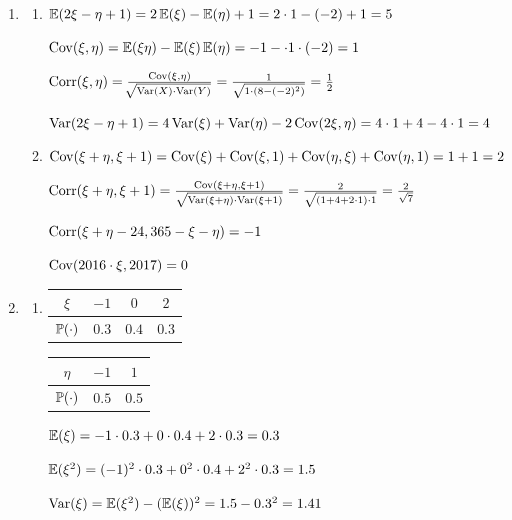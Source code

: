 \begin{enumerate}
\item \begin{enumerate}
\item $\E (2\xi - \eta +1) = 2 \E (\xi) - \E (\eta) + 1 = 2\cdot 1 - (-2) + 1 = 5 $

$\Cov (\xi, \eta) = \E (\xi \eta) - \E(\xi) \E(\eta) = -1 - \cdot 1 \cdot (-2) = 1$

$\Corr (\xi, \eta) = \frac{\Cov(\xi, \eta)}{\sqrt[]{\Var(X) \cdot \Var(Y)}} = \frac{1}{\sqrt{1 \cdot (8-(-2)^2)}} = \frac{1}{2}$

$\Var (2\xi - \eta + 1) = 4\Var(\xi) + \Var(\eta) - 2 \Cov (2\xi, \eta) = 4 \cdot 1 + 4 - 4 \cdot 1 = 4$

\item $\Cov(\xi + \eta, \xi + 1) = \Cov(\xi) + \Cov(\xi, 1) + \Cov(\eta, \xi) + \Cov(\eta, 1) = 1 +1 = 2$

$\Corr(\xi + \eta , \xi + 1) = \frac{\Cov(\xi + \eta , \xi + 1)}{\sqrt{\Var(\xi + \eta)\cdot \Var (\xi + 1)}} = \frac{2}{\sqrt{(1+4+2\cdot 1) \cdot 1}} = \frac{2}{\sqrt{7}}$

$\Corr(\xi + \eta - 24, 365 - \xi - \eta) = -1$

$\Cov(2016\cdot \xi, 2017) = 0$

\end{enumerate}
\item \begin{enumerate}
\item

\begin{center}
\begin{tabular}{cccc}
\toprule
$\xi$ & $-1$ & $0$ & $2$ \\ \midrule
$\P(\cdot)$ & $0.3$ & $0.4$ & $0.3$ \\ \bottomrule
\end{tabular}
\hspace{1cm}
\begin{tabular}{ccc}
\toprule
$\eta$ & $-1$ & $1$ \\ \midrule
$\P(\cdot)$ & $0.5$ & $0.5$ \\ \bottomrule
\end{tabular}
\end{center}

$\E(\xi) = -1 \cdot 0.3 + 0 \cdot 0.4 + 2 \cdot 0.3 = 0.3$

$\E (\xi^2) = (-1)^2 \cdot 0.3 + 0^2 \cdot 0.4 + 2^2 \cdot 0.3 = 1.5$

$\Var(\xi) = \E(\xi^2) - (\E(\xi))^2 = 1.5 - 0.3^2 = 1.41$


\end{enumerate}
\end{enumerate}
